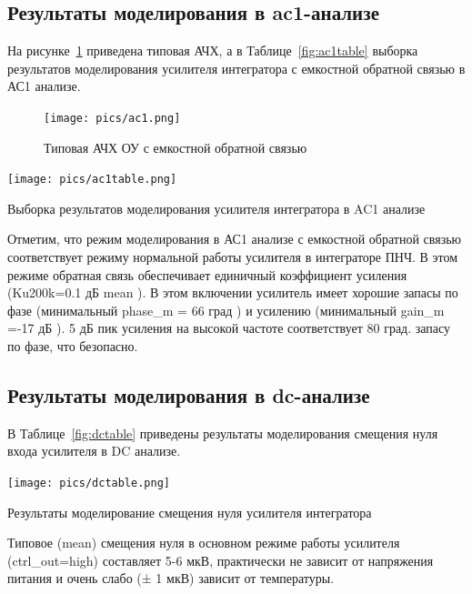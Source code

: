 \documentclass[a4paper,12pt,oneside]{scrartcl}
\begin{document}
\subsection{Результаты моделирования в ac1-анализе}

На рисунке~\ref{fig:Aс1} приведена типовая АЧХ, а в Таблице~\ref{fig:ac1table} выборка результатов моделирования усилителя интегратора с емкостной обратной связью в АС1 анализе.

\begin{figure}[!htb]
\centering
\texttt{[image: pics/ac1.png]}
\caption{Типовая АЧХ ОУ с емкостной обратной связью}
\label{fig:Aс1}
\end{figure}

\begin{table}[!htb]
    \centering
    \texttt{[image: pics/ac1table.png]}
    \caption{Выборка результатов моделирования усилителя интегратора в AC1 анализе}
    \label{fig:ac1table}
\end{table}
\FloatBarrier

Отметим, что режим моделирования в АС1 анализе с емкостной обратной связью соответствует режиму нормальной работы усилителя в интеграторе ПНЧ. В этом режиме обратная связь обеспечивает единичный коэффициент усиления (Ku200k=0.1 дБ mean ).
В этом включении усилитель имеет хорошие запасы по фазе (минимальный    phase\_m = 66 град ) и усилению (минимальный gain\_m =-17 дБ ). 5 дБ пик усиления на высокой частоте соответствует 80 град. запасу по фазе, что безопасно.






\subsection{Результаты моделирования в dc-анализе}

В Таблице~\ref{fig:dctable} приведены результаты моделирования смещения нуля входа усилителя в DC анализе.

\begin{table}[!htb]
    \centering
    \texttt{[image: pics/dctable.png]}
    \caption{Результаты моделирование смещения нуля усилителя интегратора}
    \label{fig:dctable}
\end{table}
\FloatBarrier

Типовое (mean) смещения нуля в основном режиме работы усилителя (ctrl\_out=high) составляет 5-6 мкВ, практически не зависит от напряжения питания и очень слабо (± 1 мкВ) зависит от температуры.
\end{document}
